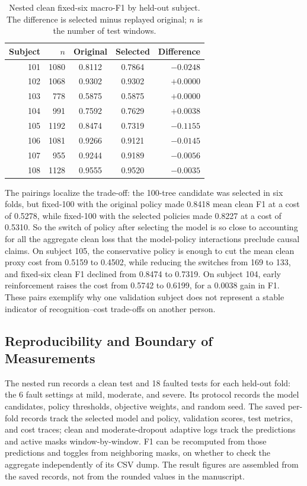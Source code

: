 \documentclass[conference]{IEEEtran}
\begin{document}
\begin{table}[t]
\caption{Nested clean fixed-six macro-F1 by held-out subject. The difference is selected minus replayed original; $n$ is the number of test windows.}
\centering\footnotesize
\begin{tabular}{r r c c r}
\toprule Subject & $n$ & Original & Selected & Difference \\
\midrule
101 & 1080 & 0.8112 & 0.7864 & $-0.0248$ \\
102 & 1068 & 0.9302 & 0.9302 & $+0.0000$ \\
103 & 778 & 0.5875 & 0.5875 & $+0.0000$ \\
104 & 991 & 0.7592 & 0.7629 & $+0.0038$ \\
105 & 1192 & 0.8474 & 0.7319 & $-0.1155$ \\
106 & 1081 & 0.9266 & 0.9121 & $-0.0145$ \\
107 & 955 & 0.9244 & 0.9189 & $-0.0056$ \\
108 & 1128 & 0.9555 & 0.9520 & $-0.0035$ \\
\bottomrule
\end{tabular}
\label{tab:subject_nested}
\end{table}

The pairings localize the trade-off: the 100-tree candidate was selected in six folds, but fixed-100 with the original policy made 0.8418 mean clean F1 at a cost of 0.5278, while fixed-100 with the selected policies made 0.8227 at a cost of 0.5310. So the switch of policy after selecting the model is so close to accounting for all the aggregate clean loss that the model-policy interactions preclude causal claims. On subject 105, the conservative policy is enough to cut the mean clean proxy cost from 0.5159 to 0.4502, while reducing the switches from 169 to 133, and fixed-six clean F1 declined from 0.8474 to 0.7319. On subject 104, early reinforcement raises the cost from 0.5742 to 0.6199, for a 0.0038 gain in F1. These pairs exemplify why one validation subject does not represent a stable indicator of recognition--cost trade-offs on another person.

\subsection{Reproducibility and Boundary of Measurements}

The nested run records a clean test and 18 faulted tests for each held-out fold: the 6 fault settings at mild, moderate, and severe. Its protocol records the model candidates, policy thresholds, objective weights, and random seed. The saved per-fold records track the selected model and policy, validation scores, test metrics, and cost traces; clean and moderate-dropout adaptive logs track the predictions and active masks window-by-window. F1 can be recomputed from those predictions and toggles from neighboring masks, on whether to check the aggregate independently of its CSV dump. The result figures are assembled from the saved records, not from the rounded values in the manuscript.
\end{document}
